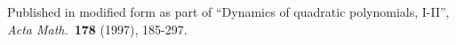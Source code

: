 {\SBI Published in modified form as part of}\hfil\break
``Dynamics of quadratic polynomials, I-II'',
{\it  Acta Math.}~{\bf 178} (1997), 185-297.
